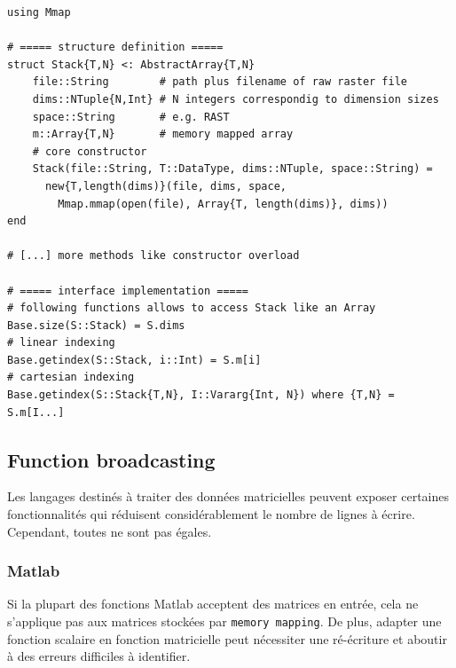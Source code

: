 \juliastyle
\begin{lstlisting}
using Mmap

# ===== structure definition =====
struct Stack{T,N} <: AbstractArray{T,N}
    file::String        # path plus filename of raw raster file
    dims::NTuple{N,Int} # N integers correspondig to dimension sizes
    space::String       # e.g. RAST
    m::Array{T,N}       # memory mapped array
    # core constructor
    Stack(file::String, T::DataType, dims::NTuple, space::String) =
      new{T,length(dims)}(file, dims, space,
        Mmap.mmap(open(file), Array{T, length(dims)}, dims))
end

# [...] more methods like constructor overload

# ===== interface implementation =====
# following functions allows to access Stack like an Array
Base.size(S::Stack) = S.dims
# linear indexing
Base.getindex(S::Stack, i::Int) = S.m[i] 
# cartesian indexing
Base.getindex(S::Stack{T,N}, I::Vararg{Int, N}) where {T,N} = S.m[I...]
\end{lstlisting}





\subsection{Function broadcasting}

Les langages destinés à traiter des données matricielles peuvent exposer certaines fonctionnalités qui réduisent considérablement le nombre de lignes à écrire. Cependant, toutes ne sont pas égales.

\subsubsection{Matlab}

Si la plupart des fonctions Matlab acceptent des matrices en entrée, cela ne s'applique pas aux matrices stockées par \verb|memory mapping|. De plus, adapter une fonction scalaire en fonction matricielle peut nécessiter une ré-écriture et aboutir à des erreurs difficiles à identifier.

